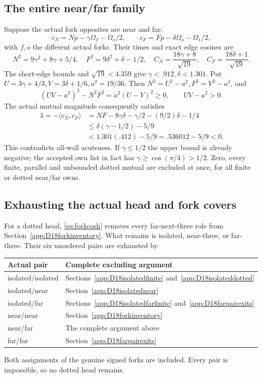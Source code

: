 \documentclass[11pt]{article}
\theoremstyle{definition}
\theoremstyle{remark}
\newcommand{\ip}[2]{\langle #1,#2\rangle}
\begin{document}
\subsection{The entire near/far family}
Suppose the actual fork opposites are near and far:
\[
 c_N=Np-\gamma\Omega_f-\Omega_o/2,\qquad
 c_F=Fp-\delta\Omega_o-\Omega_1/2,
\]
with \(f,o\) the different actual forks.
Their times and exact edge cosines are
\[
 N^2=9\gamma^2+8\gamma+5/4,\quad
 F^2=9\delta^2+\delta-1/2,\quad
 C_N=\frac{18\gamma+8}{\sqrt{19}},\quad
 C_F=\frac{18\delta+1}{\sqrt{19}}.
\]
The short-edge bounds and \(\sqrt{19}<4.359\) give
\(\gamma<.912,\delta<1.301\).
Put \(U=3\gamma+4/3,V=3\delta+1/6,a^2=19/36\).
Then \(N^2=U^2-a^2,F^2=V^2-a^2\), and
\[
 (UV-a^2)^2-N^2F^2=a^2(U-V)^2\geq0,\qquad UV-a^2>0.
\]
The actual mutual magnitude consequently satisfies
\begin{align*}
 \lambda=-\ip{c_N}{c_F}
 &=NF-8\gamma\delta-\gamma/2-(9/2)\delta-1/4\\
 &\leq\delta(\gamma-1/2)-5/9\\
 &<1.301(.412)-5/9=.536012-5/9<0.
\end{align*}
This contradicts all-wall acuteness. If \(\gamma\leq1/2\)
the upper bound is already negative; the accepted own list
in fact has \(\gamma\geq\cos(\pi/4)>1/2\).
Zero, every finite, parallel and unbounded dotted mutual
are excluded at once, for all finite or dotted near/far owns.

\subsection{Exhausting the actual head and fork covers}
For a dotted head, \eqref{eq:forkcosh} removes every
far-next-three role from Section~\ref{app:D18forkinventory}.
What remains is isolated, near-three, or far-three.
Their six unordered pairs are exhausted by
\begin{center}\small
\begin{tabular}{ll}
\toprule
Actual pair&Complete excluding argument\\ \midrule
isolated/isolated&Sections~\ref{app:D18isolatedfinite} and~\ref{app:D18isolateddotted}\\
isolated/near&Section~\ref{app:D18isolatednear}\\
isolated/far&Sections~\ref{app:D18isolatedfarfinite} and~\ref{app:D18farpairexits}\\
near/near&Section~\ref{app:D18forkinventory}\\
near/far&The complete argument above\\
far/far&Section~\ref{app:D18farpairexits}\\ \bottomrule
\end{tabular}
\end{center}
Both assignments of the genuine signed forks are included.
Every pair is impossible, so no dotted head remains.
\end{document}
